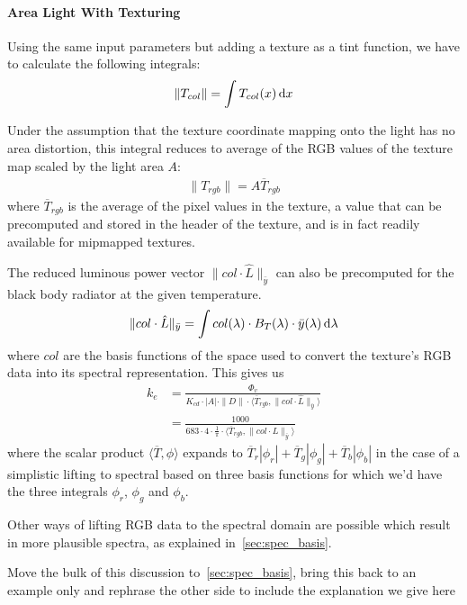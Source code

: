 \paragraph{Area Light With Texturing}
Using the same input parameters but adding a texture as a tint function,
we have to calculate the following integrals:
\begin{displaymath}
\|T_{col}\| = \int T_{col}(x) \mathop{}\!\mathrm{d} x
\end{displaymath}

Under the assumption that the texture coordinate mapping onto the light has no area
distortion, this integral reduces to average of the \gls{RGB} values of the
texture map scaled by the light area $A$:
\begin{align*}
\|T_{rgb}\| = A \overline{T}_{rgb}
\end{align*}
where $\overline{T}_{rgb}$ is the average of the pixel values in the
texture, a value that can be precomputed and stored in the header of the texture,
and is in fact readily available for mipmapped textures.

The reduced luminous power vector $\|col\cdot \hat L\|_{\bar y}$ can also
be precomputed for the black body radiator at the given temperature.
\begin{displaymath}
\|col\cdot \hat L\|_{\bar y} = \int col(\lambda) \cdot B_T(\lambda) \cdot \bar y
(\lambda) \mathop{}\!\mathrm{d}\lambda
\end{displaymath}
where $col$ are the basis functions of the space used to convert the texture's
\gls{RGB} data into its spectral representation.
This gives us
\begin{align*}
 k_e &= \frac{\Phi_v}{K_{cd} \cdot |A| \cdot \|D\| \cdot \langle \overline{T}_{rgb}, \|col\cdot\hat{L}\|_{\bar y} \rangle } \\
&= \frac{1000}{683 \cdot 4 \cdot \frac1\pi \cdot \langle \overline{T}_{rgb}, \|col\cdot\hat{L}\|_{\bar y} \rangle  }
\end{align*}
where the scalar product $\langle \overline T, \phi \rangle $ expands to  
$ \overline T_r|\phi_r| + \overline T_g|\phi_g| + \overline T_b|\phi_b| $
in the case of a simplistic lifting to spectral based on three basis functions 
for which we'd have the three integrals
$\phi_r$, $\phi_g$ and $\phi_b$.

Other ways of lifting \gls{RGB} data to the spectral domain are possible which result in more plausible
spectra, as explained in~\cref{sec:spec_basis}.

\begin{inconstruction}
	Move the bulk of this discussion to~\cref{sec:spec_basis}, bring this back to an example only
	and rephrase the other side to include the explanation we give here
\end{inconstruction}

